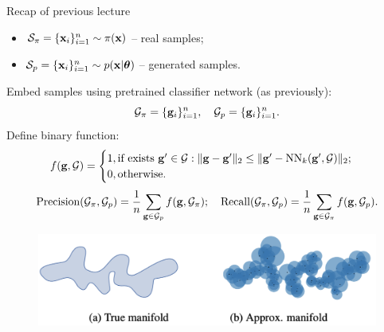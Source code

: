 

\begin{frame}
\titlepage
\end{frame}
\begin{frame}{Recap of previous lecture}
		\begin{itemize}
			\item $\mathcal{S}_{\pi} = \{\mathbf{x}_i\}_{i=1}^{n} \sim \pi(\mathbf{x})$ -- real samples;
			\item $\mathcal{S}_{p} = \{\mathbf{x}_i\}_{i=1}^{n} \sim p(\mathbf{x} | \boldsymbol{\theta})$ -- generated samples.
		\end{itemize}
		Embed samples using pretrained classifier network (as previously):
		\[
			\mathcal{G}_{\pi} = \{\mathbf{g}_i\}_{i=1}^n, \quad \mathcal{G}_{p} = \{\mathbf{g}_i\}_{i=1}^n.
		\]
		Define binary function:
		\[
			f(\mathbf{g}, \mathcal{G}) = 
			\begin{cases}
				1, \text{if exists } \mathbf{g}' \in \mathcal{G}: \| \mathbf{g}  - \mathbf{g}'\|_2 \leq \| \mathbf{g}' - \text{NN}_k(\mathbf{g}', \mathcal{G})\|_2; \\
				0, \text{otherwise.}
			\end{cases}
		\]
		\[
			\text{Precision} (\mathcal{G}_{\pi}, \mathcal{G}_{p}) = \frac{1}{n} \sum_{\mathbf{g} \in \mathcal{G}_{p}} f(\mathbf{g}, \mathcal{G}_{\pi}); \quad \text{Recall} (\mathcal{G}_{\pi}, \mathcal{G}_{p}) = \frac{1}{n} \sum_{\mathbf{g} \in \mathcal{G}_{\pi}} f(\mathbf{g}, \mathcal{G}_{p}).
		\]
		\vspace{-0.4cm}
		\begin{figure}
			\includegraphics[width=0.7\linewidth]{figs/pr_k_nearest}
		\end{figure}
\end{frame}
